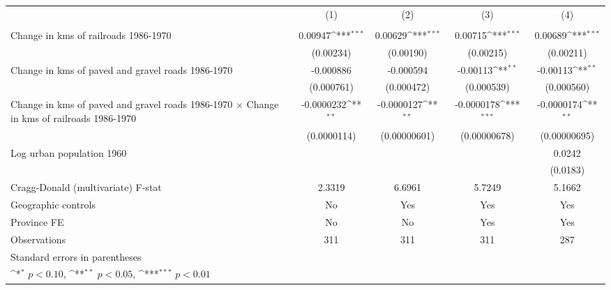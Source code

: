 {
\def\sym#1{\ifmmode^{#1}\else\(^{#1}\)\fi}
\begin{tabular}{l*{4}{c}}
\hline\hline
                &\multicolumn{1}{c}{(1)}&\multicolumn{1}{c}{(2)}&\multicolumn{1}{c}{(3)}&\multicolumn{1}{c}{(4)}\\
                &\multicolumn{1}{c}{}&\multicolumn{1}{c}{}&\multicolumn{1}{c}{}&\multicolumn{1}{c}{}\\
\hline
Change in kms of railroads 1986-1970&  0.00947\sym{***}&  0.00629\sym{***}&  0.00715\sym{***}&  0.00689\sym{***}\\
                &(0.00234)         &(0.00190)         &(0.00215)         &(0.00211)         \\
[1em]
Change in kms of paved and gravel roads 1986-1970&-0.000886         &-0.000594         & -0.00113\sym{**} & -0.00113\sym{**} \\
                &(0.000761)         &(0.000472)         &(0.000539)         &(0.000560)         \\
[1em]
Change in kms of paved and gravel roads 1986-1970 $\times$ Change in kms of railroads 1986-1970&-0.0000232\sym{**} &-0.0000127\sym{**} &-0.0000178\sym{***}&-0.0000174\sym{**} \\
                &(0.0000114)         &(0.00000601)         &(0.00000678)         &(0.00000695)         \\
[1em]
Log urban population 1960&                  &                  &                  &   0.0242         \\
                &                  &                  &                  & (0.0183)         \\
\hline
Cragg-Donald (multivariate) F-stat&   2.3319         &   6.6961         &   5.7249         &   5.1662         \\
Geographic controls&       No         &      Yes         &      Yes         &      Yes         \\
Province FE     &       No         &       No         &      Yes         &      Yes         \\
Observations    &      311         &      311         &      311         &      287         \\
\hline\hline
\multicolumn{5}{l}{\footnotesize Standard errors in parentheses}\\
\multicolumn{5}{l}{\footnotesize \sym{*} \(p<0.10\), \sym{**} \(p<0.05\), \sym{***} \(p<0.01\)}\\
\end{tabular}
}
